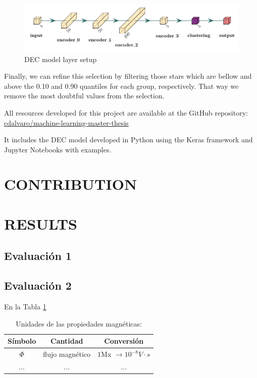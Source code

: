 \documentclass[11pt,a4paper,USenglish,twocolumn]{article}
\begin{document}
\begin{figure}
  \includegraphics[width=\columnwidth]{../figures/dec_diagram.pdf}
  \caption{DEC model layer setup}
  \label{fig:dec_model_setup}
\end{figure}

Finally, we can refine this selection by filtering those stars which are bellow and above
the 0.10 and 0.90 quantiles for each group, respectively.
That way we remove the most doubtful values from the selection.

All resources developed for this project are available at the GitHub repository:
\href{https://github.com/cdalvaro/machine-learning-master-thesis}{cdalvaro/machine-learning-master-thesis}

It includes the DEC model developed in Python using the Keras framework
and Jupyter Notebooks \cite{Kluyver2016jupyter} with examples.

\section{CONTRIBUTION}

\section{RESULTS}
\label{sec:results}

\subsection{Evaluación 1}

\subsection{Evaluación 2 }
En la Tabla \ref{tab_1}
\begin{table}\label{tab_1}
\caption{Unidades de las propiedades magnéticas:}

\begin{tabular}{ccc}\hline\hline
Símbolo & Cantidad & Conversión\\
\hline
$\Phi$ & flujo magnético & $1$Mx $\rightarrow 10^{-8}V\cdot s$\\
... &...&...\\
\hline\hline
\end{tabular}
\end{table}
\end{document}
